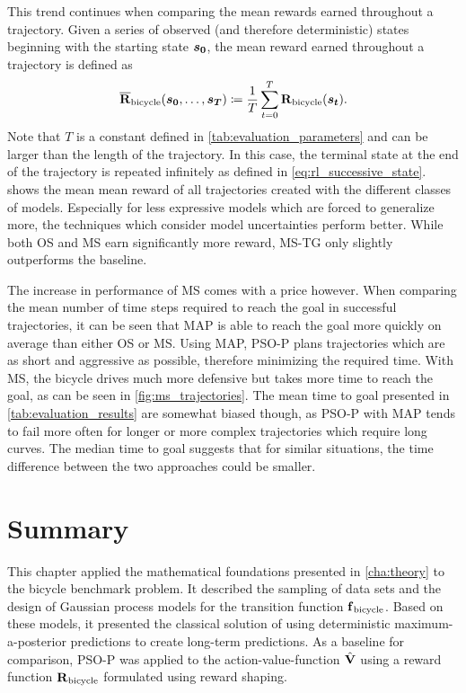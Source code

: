 This trend continues when comparing the mean rewards earned throughout a trajectory.
Given a series of observed (and therefore deterministic) states beginning with the starting state $\bm{s_0}$, the mean reward earned throughout a trajectory is defined as
\begin{align}
    \operatorname{\overline{\operatorname{\mathbf{R}}}_{\text{bicycle}}}(\bm{s_0}, \dots, \bm{s_T}) \coloneqq \frac{1}{T} \sum_{t=0}^T \operatorname{\operatorname{\mathbf{R}}_{\text{bicycle}}}(\bm{s_t}).
\end{align}
Note that $T$ is a constant defined in \cref{tab:evaluation_parameters} and can be larger than the length of the trajectory.
In this case, the terminal state at the end of the trajectory is repeated infinitely as defined in \cref{eq:rl_successive_state}.
 shows the mean mean reward of all trajectories created with the different classes of models.
Especially for less expressive models which are forced to generalize more, the techniques which consider model uncertainties perform better.
While both OS and MS earn significantly more reward, MS-TG only slightly outperforms the baseline.

The increase in performance of MS comes with a price however.
When comparing the mean number of time steps required to reach the goal in successful trajectories, it can be seen that MAP is able to reach the goal more quickly on average than either OS or MS.
Using MAP, PSO-P plans trajectories which are as short and aggressive as possible, therefore minimizing the required time.
With MS, the bicycle drives much more defensive but takes more time to reach the goal, as can be seen in \cref{fig:ms_trajectories}.
The mean time to goal presented in \cref{tab:evaluation_results} are somewhat biased though, as PSO-P with MAP tends to fail more often for longer or more complex trajectories which require long curves.
The median time to goal suggests that for similar situations, the time difference between the two approaches could be smaller.

\section{Summary}
This chapter applied the mathematical foundations presented in \cref{cha:theory} to the bicycle benchmark problem.
It described the sampling of data sets and the design of Gaussian process models for the transition function $\operatorname{\operatorname{\mathbf{f}}_{\text{bicycle}}}$.
Based on these models, it presented the classical solution of using deterministic maximum-a-posterior predictions to create long-term predictions.
As a baseline for comparison, PSO-P was applied to the action-value-function $\operatorname{\hat{\operatorname{\mathbf{V}}}}$ using a reward function $\operatorname{\operatorname{\mathbf{R}}_{\text{bicycle}}}$ formulated using reward shaping.


